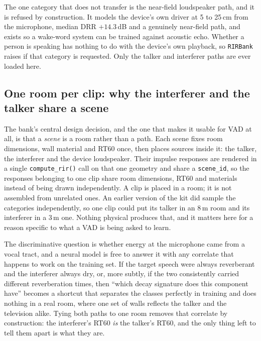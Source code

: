 \documentclass{article}
\begin{document}
The one category that does not transfer is the near-field loudspeaker path, and it is refused by construction. It models the device's own driver at 5 to 25\,cm from the microphone, median DRR $+14.3$\,dB and a genuinely near-field path, and exists so a wake-word system can be trained against acoustic echo. Whether a person is speaking has nothing to do with the device's own playback, so \texttt{RIRBank} raises if that category is requested. Only the talker and interferer paths are ever loaded here.

\subsection{One room per clip: why the interferer and the talker share a scene}
\label{sec:aug:scene}

The bank's central design decision, and the one that makes it usable for VAD at all, is that a \emph{scene} is a room rather than a path. Each scene fixes room dimensions, wall material and RT60 once, then places sources inside it: the talker, the interferer and the device loudspeaker. Their impulse responses are rendered in a single \texttt{compute\_rir()} call on that one geometry and share a \texttt{scene\_id}, so the responses belonging to one clip share room dimensions, RT60 and materials instead of being drawn independently. A clip is placed in a room; it is not assembled from unrelated ones. An earlier version of the kit did sample the categories independently, so one clip could put its talker in an 8\,m room and its interferer in a 3\,m one. Nothing physical produces that, and it matters here for a reason specific to what a VAD is being asked to learn.

The discriminative question is whether energy at the microphone came from a vocal tract, and a neural model is free to answer it with any correlate that happens to work on the training set. If the target speech were always reverberant and the interferer always dry, or, more subtly, if the two consistently carried different reverberation times, then ``which decay signature does this component have'' becomes a shortcut that separates the classes perfectly in training and does nothing in a real room, where one set of walls reflects the talker and the television alike. Tying both paths to one room removes that correlate by construction: the interferer's RT60 \emph{is} the talker's RT60, and the only thing left to tell them apart is what they are.
\end{document}
